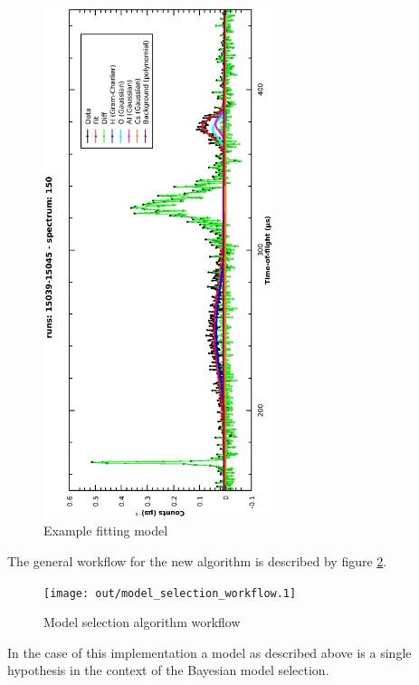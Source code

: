 \documentclass[a4paper]{article}
\begin{document}
\begin{figure}[h!]
  \centering
  \begin{turn}{-90}
    \includegraphics[width=0.6\textwidth]{graphics/exmaple_model.eps}
  \end{turn}
  \vspace{-50pt}
  \caption{Example fitting model}
  \label{fig:example_model}
\end{figure}
\FloatBarrier

The general workflow for the new algorithm is described by figure
\ref{fig:model_sel_workflow}.

\begin{figure}[h!]
  \centering
  \texttt{[image: out/model\_selection\_workflow.1]}
  \caption{Model selection algorithm workflow}
  \label{fig:model_sel_workflow}
\end{figure}
\FloatBarrier

In the case of this implementation a model as described above is a single
hypothesis in the context of the Bayesian model selection.
\end{document}
